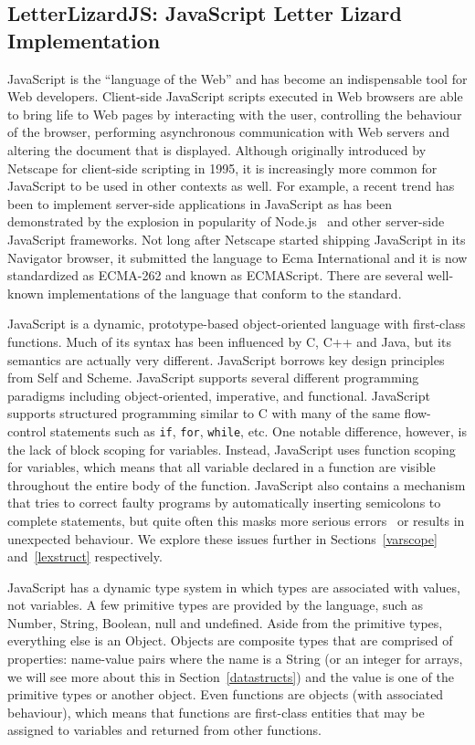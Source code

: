 \FloatBarrier
\subsection{LetterLizardJS: JavaScript Letter Lizard Implementation}
\label{lljs}

JavaScript is the ``language of the Web'' and has become an indispensable 
tool for Web developers. Client-side JavaScript scripts executed in Web
browsers are able to bring life to Web pages by interacting with the user,
controlling the behaviour of the browser, performing asynchronous communication
with Web servers and altering the document that is displayed. Although originally
introduced by Netscape for client-side scripting in 1995, it is increasingly
more common for JavaScript to be used in other contexts as well. For example,
a recent trend has been to implement server-side applications in JavaScript as
has been demonstrated by the explosion in popularity of Node.js~\cite{nodejs} and other
server-side JavaScript frameworks. Not long after Netscape started shipping 
JavaScript in its Navigator browser, it submitted the language to Ecma International
and it is now standardized as ECMA-262 and known as ECMAScript.
There are several well-known implementations of the language that conform to the standard.

JavaScript is a dynamic, prototype-based object-oriented language with first-class
functions. Much of its syntax has been influenced by C, C++ and Java, but
its semantics are actually very different. JavaScript borrows key design principles
from Self and Scheme. JavaScript supports several different programming
paradigms including object-oriented, imperative, and functional. JavaScript supports
structured programming similar to C with many of the same flow-control statements
such as \texttt{if}, \texttt{for}, \texttt{while}, etc. One notable difference,
however, is the lack of block scoping for variables. Instead, JavaScript 
uses function scoping for variables, which means that all variable declared in a
function are visible throughout the entire body of the function. 
JavaScript also contains a mechanism that tries to
correct faulty programs by automatically inserting semicolons to complete statements, but quite
often this masks more serious errors~\cite{goodparts} or results in unexpected behaviour.
We explore these issues further in Sections~\ref{varscope} and~\ref{lexstruct} respectively.

JavaScript has a dynamic type system in which types are associated with values,
not variables. A few primitive types are provided by the language, such
as Number, String, Boolean, null and undefined. Aside from the primitive types,
everything else is an Object. Objects are composite types
that are comprised of properties: name-value pairs where the name is a String
(or an integer for arrays, we will see more about this in Section~\ref{datastructs})
and the value is one of the primitive types or another object. Even functions
are objects (with associated behaviour), which means that functions are first-class
entities that may be assigned to variables and returned from other functions.


